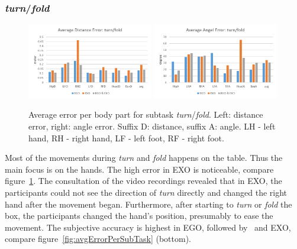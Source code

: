 \subsubsection{\textit{turn}/\textit{fold}}
\begin{figure}[H]
	\centering
	\includegraphics[width=0.49\textwidth]{figures/distanceErrorTurnFold.png}
	\includegraphics[width=0.49\textwidth]{figures/angleErrorTurnFold.png}
	\caption[Average error per body part for subtask \textit{turn}/\textit{fold}.]{Average error per body part for subtask \textit{turn}/\textit{fold}. Left: distance error, right: angle error. Suffix D: distance, suffix A: angle. LH - left hand, RH - right hand, LF - left foot, RF - right foot.}
	\label{fig:errorTurnFold}
\end{figure}
Most of the movements during \textit{turn} and \textit{fold} happens on the table. Thus the main focus is on the hands. The high error in EXO is noticeable, compare figure~\ref{fig:errorTurnFold}. The consultation of the video recordings revealed that in EXO, the participants could not see the direction of \textit{turn} directly and changed the right hand after the movement began. Furthermore, after starting to \textit{turn} or \textit{fold} the box, the participants changed the hand's position, presumably to ease the movement. The subjective accuracy is highest in EGO, followed by \combi\ and EXO, compare figure~\ref{fig:avgErrorPerSubTask} (bottom). 

